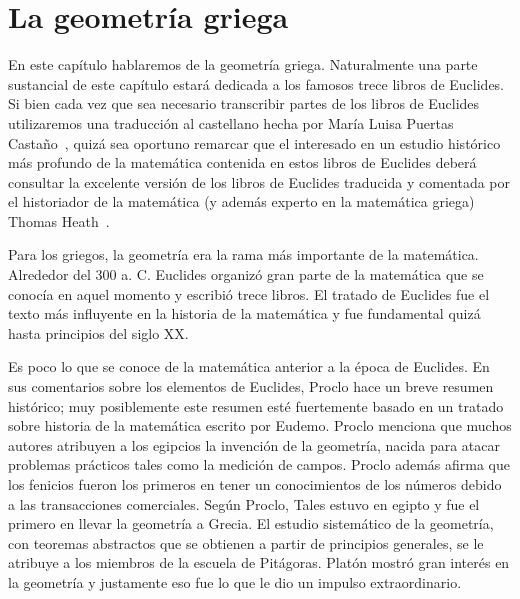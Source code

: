 \chapter{La geometría griega}

En este capítulo hablaremos de la geometría griega. Naturalmente una parte
sustancial de este capítulo estará dedicada a los famosos trece libros de
Euclides. Si bien cada vez que sea necesario transcribir partes de los libros
de Euclides utilizaremos una traducción al castellano hecha por María Luisa
Puertas Castaño~\cite{elementos1,elementos2}, quizá sea oportuno remarcar que el interesado en un estudio
histórico más profundo de la matemática contenida en estos libros de Euclides
deberá consultar la excelente versión de los libros de Euclides traducida y
comentada por el historiador de la matemática (y además experto en la
matemática griega) Thomas Heath~\cite{MR1932864}. 

Para los griegos, la geometría era la rama más importante de la matemática.
Alrededor del 300 a. C. Euclides organizó gran parte de la matemática que se
conocía en aquel momento y escribió trece libros.  El tratado de Euclides fue
el texto más influyente en la historia de la matemática y fue fundamental quizá
hasta principios del siglo XX. 

Es poco lo que se conoce de la matemática anterior a la época de Euclides. En
sus comentarios sobre los elementos de Euclides, Proclo hace un breve resumen
histórico; muy posiblemente este resumen esté fuertemente basado en un tratado
sobre historia de la matemática escrito por Eudemo. Proclo menciona que muchos
autores atribuyen a los egipcios la invención de la geometría, nacida para
atacar problemas prácticos tales como la medición de campos. Proclo además
afirma que los fenicios fueron los primeros en tener un conocimientos de los
números debido a las transacciones comerciales. Según Proclo, Tales estuvo en
egipto y fue el primero en llevar la geometría a Grecia. El estudio sistemático
de la geometría, con teoremas abstractos que se obtienen a partir de principios
generales, se le atribuye a los miembros de la escuela de Pitágoras. Platón
mostró gran interés en la geometría y justamente eso fue lo que le dio un
impulso extraordinario.


